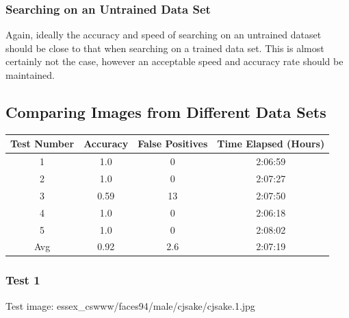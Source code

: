 \documentclass[12pt]{article}
\begin{document}
\subsubsection{Searching on an Untrained Data Set}
Again, ideally the accuracy and speed of searching on an untrained dataset should be close to that when searching on a trained data set. This is almost certainly not the case, however an acceptable speed and accuracy rate should be maintained.

\subsection{Comparing Images from Different Data Sets}
\begin{center}
\begin{tabular}{cccc}
Test Number & Accuracy & False Positives & Time Elapsed (Hours) \\
\hline
1 & 1.0 & 0 & 2:06:59\\
2 & 1.0 & 0 & 2:07:27\\
3 & 0.59 & 13 & 2:07:50\\
4 & 1.0 & 0 & 2:06:18\\
5 & 1.0 & 0 & 2:08:02\\
Avg & 0.92 & 2.6 & 2:07:19\\
\end{tabular}
\end{center}

\subsubsection{Test 1}
Test image: essex\_cswww/faces94/male/cjsake/cjsake.1.jpg
\end{document}
